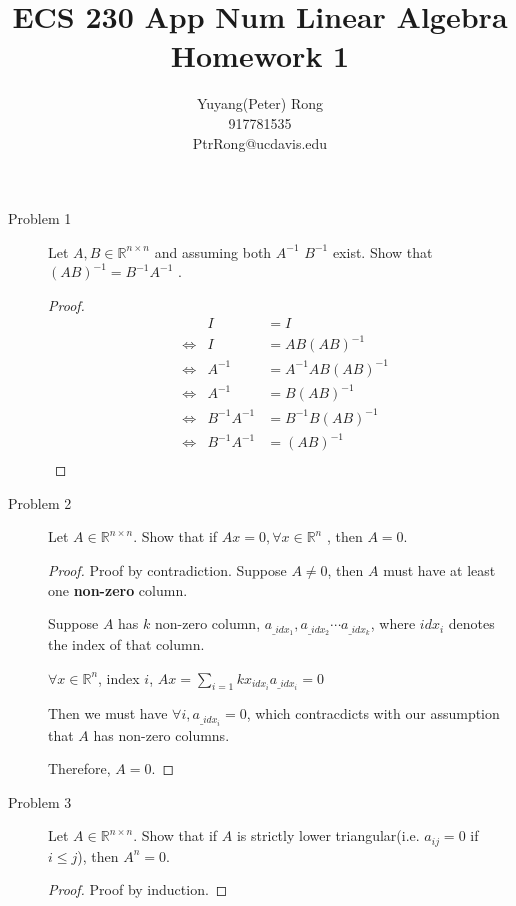 \documentclass{article}
\title{ECS 230 App Num Linear Algebra \\ Homework 1}
\author{Yuyang(Peter) Rong \\917781535 \\ PtrRong@ucdavis.edu}
\begin{document}
\maketitle

\begin{description}
	\item[Problem 1] Let $A, B \in \mathbb{R}^{n\times n}$ and assuming both $A^{-1}$ $B^{-1}$ exist. Show that $(AB)^{-1} =
		      B^{-1} A^{-1}$ .
	      \begin{proof}
		      \begin{align*}
			       &                 & I            & =  I                 \\
			       & \Leftrightarrow & I            & =  AB(AB)^{-1}       \\
			       & \Leftrightarrow & A^{-1}       & =  A^{-1}AB(AB)^{-1} \\
			       & \Leftrightarrow & A^{-1}       & =  B(AB)^{-1}        \\
			       & \Leftrightarrow & B^{-1}A^{-1} & =  B^{-1}B(AB)^{-1}  \\
			       & \Leftrightarrow & B^{-1}A^{-1} & =  (AB)^{-1}         \\
		      \end{align*}
	      \end{proof}

	\item[Problem 2] Let $A \in \mathbb{R}^{n\times n}$. Show that if $Ax = 0,  \forall x \in \mathbb{R}^n$ , then $A = 0$.
	      \begin{proof}
		      Proof by contradiction. Suppose $A \ne 0$, then $A$ must have at least one \textbf{non-zero} column.

		      Suppose $A$ has $k$ non-zero column, $a_{\_idx_1}, a_{\_idx_2} \cdots a_{\_idx_k}$, where $idx_i$ denotes the index of that column.

		      $\forall x \in \mathbb{R}^n$, index $i$, $Ax = \sum_{i = 1}{k}x_{idx_i}a_{\_idx_i}=0$

		      Then we must have $\forall i, a_{\_idx_i} = 0$, which contracdicts with our assumption that $A$ has non-zero columns.

		      Therefore, $A = 0$.
	      \end{proof}

	\item[Problem 3] Let $A \in \mathbb{R}^{n\times n}$. Show that if $A$ is strictly lower triangular(i.e. $a_{ij} = 0$ if $i \le j$), then $A^n=0$.
	      \begin{proof}
		      Proof by induction.


\end{proof}
\end{description}
\end{document}
